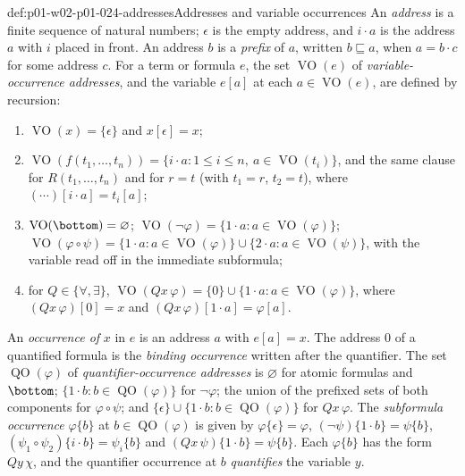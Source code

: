 \begin{hbdefinition}{def:p01-w02-p01-024-addresses}{Addresses and variable occurrences}
An \emph{address} is a finite sequence of natural numbers; \(\epsilon\) is
the empty address, and \(i\cdot a\) is the address \(a\) with \(i\) placed in
front.  An address \(b\) is a \emph{prefix} of \(a\), written
\(b\sqsubseteq a\), when \(a=b\cdot c\) for some address \(c\).  For a term
or formula \(e\), the set \(\operatorname{VO}(e)\) of
\emph{variable-occurrence addresses}, and the variable
\(e[a]\) at each \(a\in\operatorname{VO}(e)\), are defined by recursion:
\begin{enumerate}
\item \(\operatorname{VO}(x)=\{\epsilon\}\) and \(x[\epsilon]=x\);
\item \(\operatorname{VO}(f(t_1,\ldots,t_n))=
  \{i\cdot a:1\leq i\leq n,\ a\in\operatorname{VO}(t_i)\}\), and the same
  clause for \(R(t_1,\ldots,t_n)\) and for \(r=t\) (with \(t_1=r\),
  \(t_2=t\)), where \((\cdots)[i\cdot a]=t_i[a]\);
\item \(\operatorname{VO}(\bottom)=\varnothing\);
  \(\operatorname{VO}(\neg\varphi)=\{1\cdot a:a\in\operatorname{VO}(\varphi)\}\);
  \(\operatorname{VO}(\varphi\circ\psi)=
  \{1\cdot a:a\in\operatorname{VO}(\varphi)\}\cup
  \{2\cdot a:a\in\operatorname{VO}(\psi)\}\), with the variable read off in
  the immediate subformula;
\item for \(Q\in\{\forall,\exists\}\),
  \(\operatorname{VO}(Qx\,\varphi)=\{0\}\cup
  \{1\cdot a:a\in\operatorname{VO}(\varphi)\}\), where
  \((Qx\,\varphi)[0]=x\) and \((Qx\,\varphi)[1\cdot a]=\varphi[a]\).
\end{enumerate}
An \emph{occurrence of} \(x\) in \(e\) is an address \(a\) with
\(e[a]=x\).  The address \(0\) of a quantified formula is the
\emph{binding occurrence} written after the quantifier.  The set
\(\operatorname{QO}(\varphi)\) of \emph{quantifier-occurrence addresses} is
\(\varnothing\) for atomic formulas and \(\bottom\); \(\{1\cdot b:b\in
\operatorname{QO}(\varphi)\}\) for \(\neg\varphi\); the union of the
prefixed sets of both components for \(\varphi\circ\psi\); and
\(\{\epsilon\}\cup\{1\cdot b:b\in\operatorname{QO}(\varphi)\}\) for
\(Qx\,\varphi\).  The \emph{subformula occurrence} \(\varphi\{b\}\) at
\(b\in\operatorname{QO}(\varphi)\) is given by \(\varphi\{\epsilon\}=\varphi\),
\((\neg\psi)\{1\cdot b\}=\psi\{b\}\),
\((\psi_1\circ\psi_2)\{i\cdot b\}=\psi_i\{b\}\) and
\((Qx\,\psi)\{1\cdot b\}=\psi\{b\}\).  Each \(\varphi\{b\}\) has the form
\(Qy\,\chi\), and the quantifier occurrence at \(b\) \emph{quantifies} the
variable \(y\).
\end{hbdefinition}

